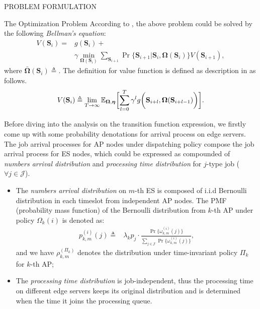 \documentclass[10pt, conference, letterpaper]{IEEEtran}
\newcommand{\define}{\triangleq}
\newcommand{\vecG}{\boldsymbol}
\DeclarePairedDelimiter{\Paren}{\bigg(}{\bigg)}
\DeclarePairedDelimiter{\Bracket}{\bigg[}{\bigg]}
\newcommand{\jSpace}{\mathcal{J}}
\newcommand{\Stat}{\mathbf{S}}
\newcommand{\Policy}{\mathbf{\Omega}}
\begin{document}
\begin{section}{PROBLEM FORMULATION}
\begin{subsection}{The Optimization Problem}
            According to \cite{sutton1998introduction}, the above problem could be solved by the following \emph{Bellman's equation}:
            \begin{align}
                V(\Stat_{i}) =&  g(\Stat_i) +
                \nonumber\\
                &\gamma \min_{\Policy(\Stat_{i})} \sum_{\Stat_{i+1}}
                    \Pr\{ \Stat_{i+1}|\Stat_{i}, \Policy(\Stat_{i}) \} V(\Stat_{i+1}),
            \end{align}
            where $\bar{\Policy}(\Stat_{i}) \define$. The definition for value function is defined as description in \cite{sutton1998introduction} as follows.
            \begin{align}
                V(\Stat_{i}) \define \lim_{T\to\infty}
                    \mathbb{E}_{\Policy,\vecG{\eta}} \Bracket{
                        \sum_{l=0}^{T} \gamma^l g\Paren{\Stat_{i+l}, \Policy(\Stat_{i+l-1})}
                    }.
            \end{align}

            Before diving into the analysis on the transition function expression, we firstly come up with some probability denotations for arrival process on edge servers.
            The job arrival processes for AP nodes under dispatching policy compose the job arrival process for ES nodes, which could be expressed as compounded of \emph{numbers arrival distribution} and \emph{processing time distribution} for $j$-type job ($\forall j\in\jSpace$).
            \begin{itemize}
                \item The \emph{numbers arrival distribution} on $m$-th ES is composed of i.i.d Bernoulli distribution in each timeslot from independent AP nodes. The PMF (probability mass function) of the Bernoulli distribution from $k$-th AP under policy $\Omega_k(i)$ is denoted as:
                \begin{align}
                    p_{k,m}^{(i)}(j) \define& \lambda_k p_j \cdot
                        \frac{
                                \Pr\{\omega_{k,m}^{(i)}(j)\}
                            }{
                                \sum_{j\in\jSpace} \Pr\{\omega_{k,m}^{(i)}(j)\}
                            },
                \end{align}
                and we have $\rho_{k,m}^{(\Pi_k)}$ denotes the distribution under time-invariant policy $\Pi_k$ for $k$-th AP;
                \item The \emph{processing time distribution} is job-independent, thus the processing time on different edge servers keeps its original distribution and is determined when the time it joins the processing queue.
            \end{itemize}
            

\end{subsection}
\end{section}
\end{document}
